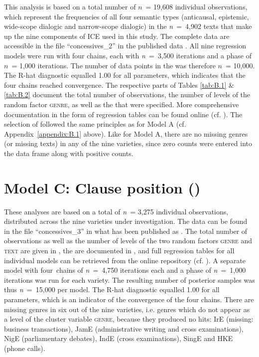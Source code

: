 This analysis is based on a total number of $n$~= 19,608 individual observations, which represent the frequencies of all four semantic types (anticausal, epistemic, wide-scope dialogic and narrow-scope dialogic) in the \textit{n~}=~4,902 texts that make up the nine components of ICE used in this study. The complete data are accessible in the file “concessives\_2” in the published data \citep{Schützler2021}. All nine regression models were run with four chains, each with \textit{n~}=~3,500 iterations and a  phase of $n$~= 1,000 iterations. The number of data points in the  was therefore $n$~= 10,000. The R-hat diagnostic equalled 1.00 for all parameters, which indicates that the four chains reached convergence. The respective parts of Tables \ref{tab:B.1} \& \ref{tab:B.2} document the total number of observations, the number of levels of the random factor \textsc{genre}, as well as the  that were specified. More comprehensive documentation in the form of regression tables can be found online (cf. ). The selection of  followed the same principles as for Model A (cf. Appendix~\ref{appendix:B.1} above). Like for Model A, there are no missing genres (or missing texts) in any of the nine varieties, since zero counts were entered into the data frame along with positive counts.

\section{Model C: Clause position ()}\label{appendix:B.3}\label{bkm:Ref41473777}

These analyses are based on a total of \textit{n}~= 3,275 individual observations, distributed across the nine varieties under investigation. The data can be found in the file “concessives\_3” in what has been published as \citep{Schützler2021}. The total number of observations as well as the number of levels of the two random factors \textsc{genre} and \textsc{text} are given in , the  are documented in , and full regression tables for all individual models can be retrieved from the online repository (cf. ). A separate model with four~chains of \textit{n~}=~4,750 iterations each and a  phase of \textit{n}~=~1,000 iterations was run for each variety. The resulting number of posterior samples was thus \textit{n~}=~15,000 per model. The R-hat diagnostic equalled 1.00 for all parameters, which is an indicator of the convergence of the four chains. There are missing genres in six out of the nine varieties, i.e. genres which do not appear as a level of the cluster variable \textsc{genre}, because they produced no hits: IrE (missing: business transactions), JamE (administrative writing and cross examinations), NigE (parliamentary debates), IndE (cross examinations), SingE and HKE (phone calls).

